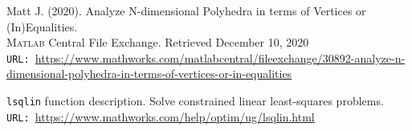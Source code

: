 \documentclass[12pt]{article}
\numberwithin{equation}{section}
\begin{document}
\begin{spacing}{1.5}
\begin{thebibliography}{8}
		Matt J. (2020). Analyze N-dimensional Polyhedra in terms of Vertices or (In)Equalities. \\
		\textsc{Matlab} Central File Exchange. Retrieved December 10, 2020\\
		\texttt{URL: }\url{https://www.mathworks.com/matlabcentral/fileexchange/30892-analyze-n-dimensional-polyhedra-in-terms-of-vertices-or-in-equalities}
		
		\texttt{lsqlin} function description. Solve constrained linear least-squares problems. \\
		\texttt{URL: }\url{https://www.mathworks.com/help/optim/ug/lsqlin.html}
	\end{thebibliography}

	\end{spacing}
	
\end{document}
